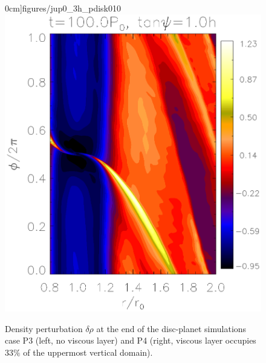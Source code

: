 \begin{figure}
     0cm]{figures/jup0_3h_pdisk010}\includegraphics[scale=.39,clip=true,trim=2.3cm
     1.84cm 0cm
     0cm]{figures/jup1_3h_pdisk008}
   \caption{Density perturbation $\delta\rho$ at the end of the
     disc-planet simulations case P3 (left, no viscous layer) and P4
     (right, viscous layer occupies $33\%$ of the uppermost vertical
     domain).   
     \label{jup0_3h}}
\end{figure}
 


